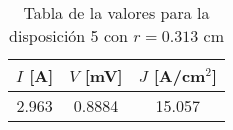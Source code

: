 \begin{table}[h!]
    \centering
\begin{tabular}{ccc}
\toprule
$I$ [A] & $V$ [mV] & $J$ [A/cm$^2$] \\
\midrule
2.963 & 0.8884 & 15.057 \\
\bottomrule
\end{tabular}
    \caption{Tabla de la valores para la disposición 5 con $r=0.313$ cm}
    \label{Tab:VIJ_mini_5}
\end{table}
